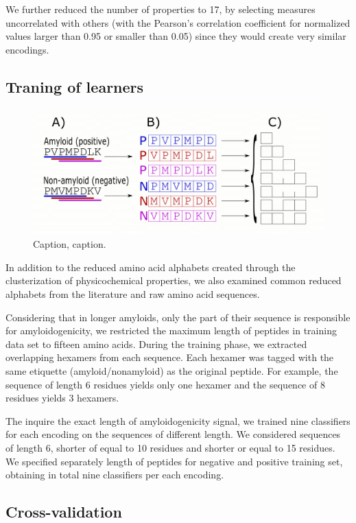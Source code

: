 \documentclass{bioinfo}
\begin{document}
\begin{methods}
We further reduced the number of properties to 17, by selecting measures uncorrelated with others (with the Pearson's correlation coefficient for normalized values larger than 0.95 or smaller than 0.05) since they would create very similar encodings.

\subsection{Traning of learners}


\begin{figure}[!tpb]%
\centerline{\includegraphics[width=\textwidth]{figures/ngram_scheme.png}}
\caption{Caption, caption.}\label{fig:01}
\end{figure}

In addition to the reduced amino acid alphabets created through the clusterization of physicochemical properties, we also examined common reduced alphabets from the literature and raw amino acid sequences.  

Considering that in longer amyloids, only the part of their sequence is responsible for amyloidogenicity, we restricted the maximum length of peptides in training data set to fifteen amino acids. During the training phase, we extracted overlapping hexamers from each sequence. Each hexamer was tagged with the same etiquette (amyloid/nonamyloid) as the original peptide. For example, the sequence of length 6 residues yields only one hexamer and the sequence of 8 residues yields 3 hexamers.

The inquire the exact length of amyloidogenicity signal, we trained nine classifiers for each encoding on the sequences of different length. We considered sequences of length 6, shorter of equal to 10 residues and shorter or equal to 15 residues. We specified separately length of peptides for negative and positive training set, obtaining in total nine classifiers per each encoding.

\subsection{Cross-validation}


\end{methods}
\end{document}
